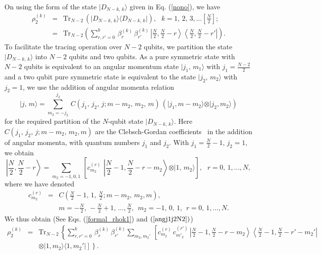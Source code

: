 \documentclass[pra,a4paper,showpacs,superscriptaddress]{revtex4}
\newcommand{\be}{\begin{equation}}
\newcommand{\ee}{\end{equation}}
\begin{document}
On using the form of the state 
$\vert D_{N-k,\,k}\rangle$ given in  Eq. ({\ref{nono}}), we have 
\begin{eqnarray}
\label{formal_rhok1}
\rho^{(k)}_2&=&\mbox{Tr}_{N-2}\,\left(\vert D_{N-k,\,k}\rangle \langle D_{N-k,\,k}\vert\right),\ \ \  k=1,\,2,\,3,\ldots \left[\frac{N}{2}\right];\nonumber \\
&=&\mbox{Tr}_{N-2}\left(\sum_{r,r'=0}^k\, \beta^{(k)}_{r}\, \beta^{(k)}_{r'}\,  \left\vert\frac{N}{2},\frac{N}{2}-r \right\rangle
 \left\langle\frac{N}{2},\frac{N}{2}-r' \right\vert \right).
\end{eqnarray}
To facilitate the tracing operation over $N-2$ qubits, we partition the state $\vert D_{N-k,\,k}\rangle$ into $N-2$ qubits and two qubits. As a pure symmetric state with $N-2$ qubits is equivalent to an angular momentum state
$\vert j_1,\,m_1\rangle$ with $j_1=\frac{N-2}{2}$
and a two qubit pure symmetric state is equivalent to the state $\vert j_2,\,m_2\rangle$ with  $j_2=1$, we use the addition of angular momenta relation~\cite{Var}  
\be
\label{angj1j2}
\vert j,\,m\rangle =\sum_{m_2=-j_2}^{j_2}\, C(j_1,\, j_2,\, j;m-m_2,\, m_2,\, m) \, \left(\vert j_1,m-m_2 \rangle\otimes\vert j_2,m_2 \rangle\right)
\ee 
for the required partition of the $N$-qubit state $\vert D_{N-k,\,k}\rangle$. Here $C(j_1,\, j_2,\, j;m-m_2,\, m_2, m)$ are the Clebsch-Gordan coefficients~\cite{Var} in the addition of angular momenta, with quantum numbers $j_1$ and $j_2$.
With $j_1=\frac{N}{2}-1$, $j_2=1$, we obtain
\be
\label{angj1j2N2}
\left\vert\frac{N}{2},\frac{N}{2}-r \right\rangle=\sum_{m_2=-1,0,1}\,\left[ c_{m_2}^{(r)}\,\, 
\left\vert\frac{N}{2}-1,\frac{N}{2}-r-m_2 \right\rangle\otimes\vert 1,\,m_2\rangle \right], \ \ \ r=0,\,1,\ldots,N,
\ee 
where we have denoted
\begin{eqnarray}
\label{cgp}
c_{m_2}^{(r)}&=&C\left(\frac{N}{2}-1,\, 1,\, \frac{N}{2}; m-m_2,\, m_2, m\right), \\ 
& & m=-\frac{N}{2},\,-\frac{N}{2}+1,\,\ldots,\frac{N}{2},
\ \    m_2=-1,\,0,\,1,\ \   r=0,\,1,\ldots,N. \nonumber
\end{eqnarray}   
 We thus obtain (See Eqs. (\ref{formal_rhok1}) and $(\ref{angj1j2N2})$)
\begin{eqnarray*}
\rho^{(k)}_2&=&\mbox{Tr}_{N-2}\,\left\{\sum_{r,r'=0}^k\, \beta^{(k)}_r\, \beta^{(k)}_{r'} \sum_{m_2,m_2'}\,\left[ c_{m_2}^{(r)}\, 
c_{m'_2}^{(r')}\,
\left\vert\frac{N}{2}-1,\frac{N}{2}-r-m_2 \right\rangle \left\langle \frac{N}{2}-1,\frac{N}{2}-r'-m_2'   \right\vert \right. \right. \\
 & & \left. \left. \otimes \vert 1, m_2\rangle \langle 1, m_2'\vert \right]  \right\}. 
\end{eqnarray*}
\end{document}
